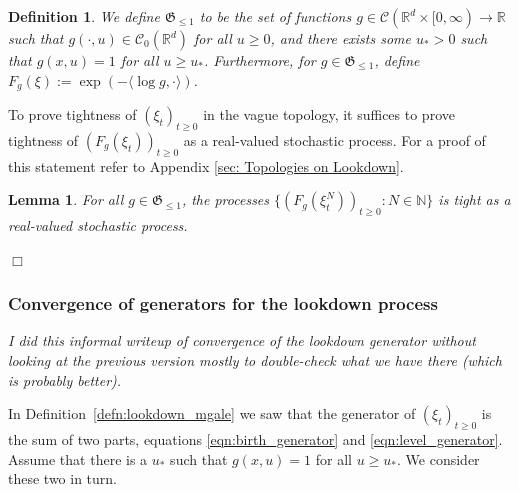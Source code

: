 \documentclass[12pt]{article}
\newenvironment {proof}{{\noindent\bf Proof }}{\hfill $\Box$ \medskip}
\newtheorem{lemma}[theorem]{Lemma}
\newtheorem{definition}[theorem]{Definition}
\newcommand{\lp}{\xi}              %
\newcommand{\comment}[1]{{\color{blue} \it #1}}
\begin{document}
\begin{definition}
We define $\mathfrak{G}_{\leq 1}$ to be the set of functions $g \in \mathcal{C}(\mathbb{R}^d \times [0, \infty) \to \mathbb{R}$ such that 
$g(\cdot, u) \in \mathcal{C}_{0}(\mathbb{R}^d)$ for all $u \geq 0$, and there exists some $u_{*}>0$ such that $g(x,u)=1$ for all $u \geq u_{*}$. Furthermore, for $g \in \mathfrak{G}_{\leq 1}$, define $F_g(\xi):= \exp(-\langle \log g, \cdot \rangle )$.
\end{definition}

To prove tightness of $(\xi_t)_{t \geq 0}$ in the vague topology, it suffices to prove tightness of $(F_g(\xi_t))_{t \geq 0}$ as a real-valued stochastic process. For a proof of this statement refer to Appendix \ref{sec: Topologies on Lookdown}.

\begin{lemma}
For all $g \in \mathfrak{G}_{\leq 1}$, the processes $\{(F_g(\xi^N_t))_{t \geq 0}: N \in \mathbb{N}\}$ is tight as a real-valued stochastic process.
\end{lemma}
\begin{proof}

\end{proof}


\subsubsection{Convergence of generators for the lookdown process}
    \label{sec:lookdown_generator_proofs}


\comment{
    I did this informal writeup of convergence of the lookdown generator
    without looking at the previous version
    mostly to double-check what we have there
    (which is probably better).
}

In Definition~\ref{defn:lookdown_mgale} we saw that the generator
of $(\lp_t)_{t \ge 0}$ is the sum of two parts,
equations \eqref{eqn:birth_generator} and \eqref{eqn:level_generator}.
Assume that there is a $u_*$ such that $g(x, u) = 1$ for all $u \ge u_*$.
We consider these two in turn.
\end{document}
